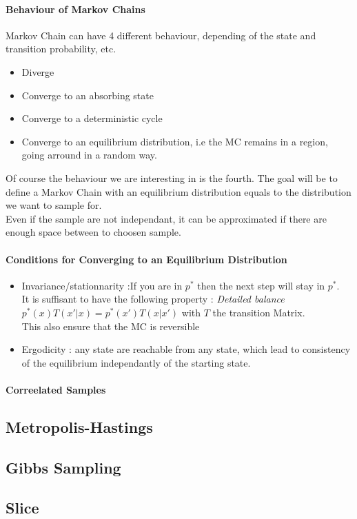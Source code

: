 			\paragraph*{Behaviour of Markov Chains}
				Markov Chain can have 4 different behaviour, depending of the state and transition probability, etc.
				\begin{itemize}
					\item Diverge
					\item Converge to an absorbing state
					\item Converge to a deterministic cycle
					\item Converge to an equilibrium distribution, i.e the MC remains in a region, going arround in a random way.
				\end{itemize}
				Of course the behaviour we are interesting in is the fourth. The goal will be to define a Markov Chain with an equilibrium distribution equals to the distribution we want to sample for.\\
				Even if the sample are not independant, it can be approximated if there are enough space between to choosen sample.

			\paragraph*{Conditions for Converging to an Equilibrium Distribution}
				\begin{itemize}
					\item Invariance/stationnarity :If you are in $p^*$ then the next step will stay in $p^*$.\\
					It is suffisant to have the following property : \emph{Detailed balance} $p^*(x)T(x'|x) = p^*(x') T(x |x')$ with $T$ the transition Matrix.\\
					This also ensure that the MC is reversible
					\item Ergodicity : any state are reachable from any state, which lead to consistency of the equilibrium independantly of the starting state.
				\end{itemize}

			\paragraph*{Correelated Samples}

		\subsection{Metropolis-Hastings}

		\subsection{Gibbs Sampling}

		\subsection{Slice}



